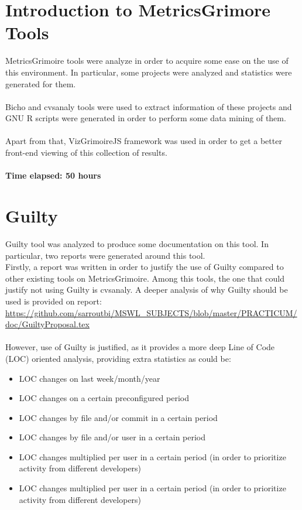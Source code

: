 \documentclass[11pt]{article}
\begin{document}
\section{Introduction to MetricsGrimore Tools}
MetricsGrimoire tools were analyze in order to acquire some ease on the use of this environment. In particular, some projects were analyzed and statistics were generated for them.\\
\\
Bicho and cvsanaly tools were used to extract information of these projects and GNU R scripts were generated in order to perform some data mining of them.\\
\\
Apart from that, VizGrimoireJS framework was used in order to get a better front-end viewing of this collection of results.\\
\\
\textbf{Time elapsed: 50 hours}

\section{Guilty}

Guilty tool was analyzed to produce some documentation on this tool. In particular, two reports were generated around this tool.\\
Firstly, a report was written in order to justify the use of Guilty compared to other existing tools on MetricsGrimoire. Among this tools, the one that could justify not using Guilty is cvsanaly. A deeper analysis of why Guilty should be used is provided on report:\\

\url{https://github.com/sarroutbi/MSWL_SUBJECTS/blob/master/PRACTICUM/doc/GuiltyProposal.tex}\\
\\
However, use of Guilty is justified, as it provides a more deep Line of Code (LOC) oriented analysis, providing extra statistics as could be:\\

\begin{itemize}
\item{LOC changes on last week/month/year}
\item{LOC changes on a certain preconfigured period}
\item{LOC changes by file and/or commit in a certain period}
\item{LOC changes by file and/or user in a certain period}
\item{LOC changes multiplied per user in a certain period (in order to prioritize activity from different developers)}
\item{LOC changes multiplied per user in a certain period (in order to prioritize activity from different developers)}
\end{itemize}
\end{document}
